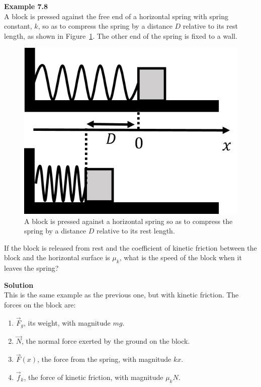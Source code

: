 \begin{framed}
\textbf{Example 7.8}\\
A block is pressed against the free end of a horizontal spring with spring constant, $k$, so as to compress the spring by a distance $D$ relative to its rest length, as shown in Figure~\ref{fig:workenergy:spring3}. The other end of the spring is fixed to a wall.

\begin{figure}[!htbp]
\centering
\includegraphics[width=0.4\linewidth]{files/spring-fb0b7b45895ba1ffc941557cc6a32aee.png}
\caption[]{A block is pressed against a horizontal spring so as to compress the spring by a distance $D$ relative to its rest length.}
\label{fig:workenergy:spring3}
\end{figure}

If the block is released from rest and the coefficient of kinetic friction between the block and the horizontal surface is $\mu_k$, what is the speed of the block when it leaves the spring?

\begin{framed}
\textbf{Solution}\\
This is the same example as the previous one, but with kinetic friction. The forces on the block are:

\begin{enumerate}
\item $\vec F_g$, its weight, with magnitude $mg$.
\item $\vec N$, the normal force exerted by the ground on the block.
\item $\vec F(x)$, the force from the spring, with magnitude $kx$.
\item $\vec f_k$, the force of kinetic friction, with magnitude $\mu_kN$.
\end{enumerate}


\end{framed}
\end{framed}
